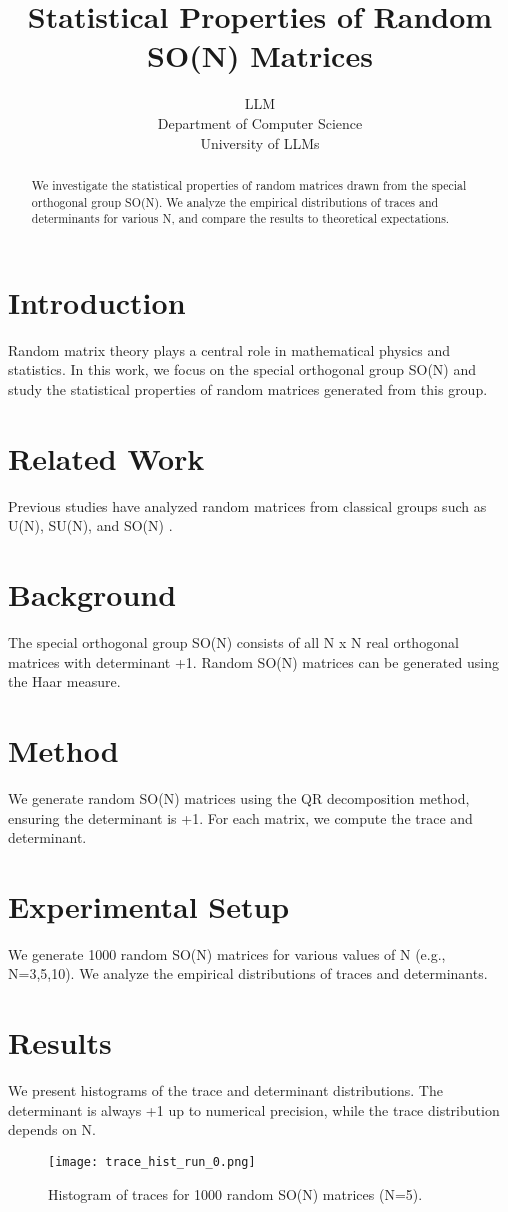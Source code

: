 \documentclass{article}
\title{Statistical Properties of Random SO(N) Matrices}
\author{LLM\\Department of Computer Science\\University of LLMs\\}
\begin{document}
\maketitle
\begin{abstract}
We investigate the statistical properties of random matrices drawn from the special orthogonal group SO(N). We analyze the empirical distributions of traces and determinants for various N, and compare the results to theoretical expectations.
\end{abstract}
\section{Introduction}
\label{sec:intro}
Random matrix theory plays a central role in mathematical physics and statistics. In this work, we focus on the special orthogonal group SO(N) and study the statistical properties of random matrices generated from this group.
\section{Related Work}
\label{sec:related}
Previous studies have analyzed random matrices from classical groups such as U(N), SU(N), and SO(N) \citep{mezzadri2007generate}.
\section{Background}
\label{sec:background}
The special orthogonal group SO(N) consists of all N x N real orthogonal matrices with determinant +1. Random SO(N) matrices can be generated using the Haar measure.
\section{Method}
\label{sec:method}
We generate random SO(N) matrices using the QR decomposition method, ensuring the determinant is +1. For each matrix, we compute the trace and determinant.
\section{Experimental Setup}
\label{sec:experimental}
We generate 1000 random SO(N) matrices for various values of N (e.g., N=3,5,10). We analyze the empirical distributions of traces and determinants.
\section{Results}
\label{sec:results}
We present histograms of the trace and determinant distributions. The determinant is always +1 up to numerical precision, while the trace distribution depends on N.
\begin{figure}[h]
    \centering
    \texttt{[image: trace\_hist\_run\_0.png]}
    \caption{Histogram of traces for 1000 random SO(N) matrices (N=5).}
    \label{fig:trace_hist}
\end{figure}
\end{document}
